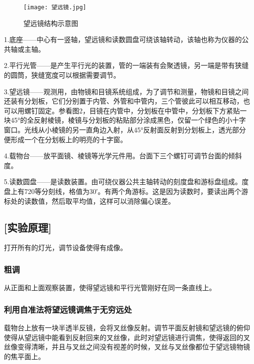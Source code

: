 \documentclass[12pt,a4paper,UTF8]{ctexart}
\begin{document}
\begin{figure}[!htbp]
	\centering
	\texttt{[image: 望远镜.jpg]}
	\caption{望远镜结构示意图}
\end{figure}
\par 1.底座——中心有一竖轴，望远镜和读数圆盘可绕该轴转动，该轴也称为仪器的公共轴或主轴。

\par 2.平行光管——是产生平行光的装置，管的一端装有会聚透镜，另一端是带有狭缝的圆筒，狭缝宽度可以根据需要调节。

\par 3.望远镜——观测用，由物镜和目镜系统组成，为了调节和测量，物镜和目镜之间还装有分划板，它们分别置于内管、外管和中管内，三个管彼此可以相互移动，也可以用螺钉固定。参看图2，目镜在内管中，分划板在中管中，分划板下方紧贴一块45°的全反射棱镜，棱镜与分划板的粘贴部分涂成黑色，仅留一个绿色的小十字窗口。光线从小棱镜的另一直角边入射，从45°反射面反射到分划板上，透光部分便形成一个在分划板上的明亮的十字窗。

\par 4.载物台——放平面镜、棱镜等光学元件用。台面下三个螺钉可调节台面的倾斜度。

\par 5.读数圆盘——是读数装置。由可绕仪器公共主轴转动的刻度盘和游标盘组成。度盘上有720等分刻线，格值为30′。有两个角游标。这是因为读数时，要读出两个游标处的读数值，然后取平均值，这样可以消除偏心误差。
\subsection*{[实验原理]}
\par 打开所有的灯光，调节设备使得有成像。
\subsubsection*{粗调}
\par 从正面和上面观察装置，使得望远镜和平行光管刚好在同一条直线上。
\subsubsection*{利用自准法将望远镜调焦于无穷远处}
\par 载物台上放有一块半透半反镜，会将叉丝像反射。调节平面反射镜和望远镜的俯仰使得从望远镜中能看到反射回来的叉丝像，此时对望远镜进行调焦，使得返回的叉丝像变得清晰，并且与叉丝之间没有视差的时候，叉丝与叉丝像都位于望远镜物镜的焦平面上。
\end{document}

